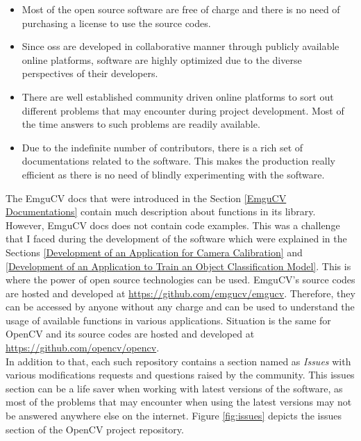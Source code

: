 \documentclass[a4paper,12pt]{report}%
\begin{document}
\begin{itemize}
	\item Most of the open source software are free of charge and there is no need of purchasing a license to use the source codes.
	
	\item Since \ac{oss} are developed in collaborative manner through publicly available online platforms, software are highly optimized due to the diverse perspectives of their developers. 
	
	\item There are  well established community driven online platforms to sort out different problems that may encounter during project development. Most of the time answers to such problems are readily available.
	
	\item Due to the indefinite number of contributors, there is a rich set of documentations related to the software. This makes the production really efficient as there is no need of blindly experimenting with the software.

\end{itemize}

The EmguCV docs that were introduced in the Section \ref{EmguCV Documentations} contain much description about functions in its library.
However, EmguCV docs does not contain code examples. This was a challenge  that I faced during the development of the software which were explained in the Sections \ref{Development of an Application for Camera Calibration} and \ref{Development of an Application to Train an Object Classification Model}. This is where the power of open source technologies can be used. EmguCV's source codes are hosted and developed at \url{https://github.com/emgucv/emgucv}. Therefore, they can be accessed by anyone without any charge and can be used to understand the usage of available functions in various applications. Situation is the same for OpenCV and its source codes are hosted and developed at \url{https://github.com/opencv/opencv}.\\

In addition to that, each such repository contains a section named as \textit{Issues} with various modifications requests and questions raised by the community. This issues section can be a life saver when working with latest versions of the software, as most of the problems that may encounter when using the latest versions may not be answered anywhere else on the internet. Figure \ref{fig:issues} depicts the issues section of the OpenCV project repository.
\end{document}
